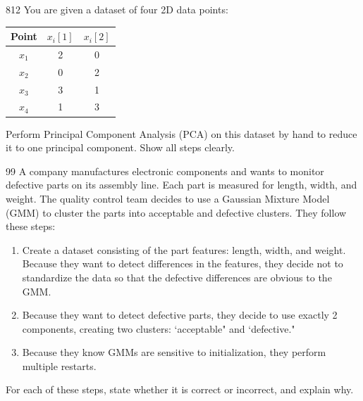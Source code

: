 \documentclass[11pt]{article}
\begin{document}
\begin{studentanswer}[20]
\end{studentanswer}


\begin{problem}{8}{12}
You are given a dataset of four 2D data points:

\begin{center}
\begin{tabular}{c|cc}
\textbf{Point} & $x_i\left[1\right]$ & $x_i\left[2\right]$ \\ \hline
$x_1$ & 2 & 0 \\
$x_2$ & 0 & 2 \\
$x_3$ & 3 & 1 \\
$x_4$ & 1 & 3 \\
\end{tabular}
\end{center}

Perform Principal Component Analysis (PCA) on this dataset by hand to reduce it to one principal component. Show all steps clearly.
\end{problem}

\begin{studentanswer}[20]
\end{studentanswer}



\begin{problem}{9}{9}
A company manufactures electronic components and wants to monitor defective parts on its assembly line. Each part is measured for length, width, and weight. The quality control team decides to use a Gaussian Mixture Model (GMM) to cluster the parts into acceptable and defective clusters. They follow these steps:
\begin{enumerate}[label=(\alph*)]
\item Create a dataset consisting of the part features: length, width, and weight. Because they want to detect differences in the features, they decide not to standardize the data so that the defective differences are obvious to the GMM.
\item Because they want to detect defective parts, they decide to use exactly 2 components, creating two clusters: `acceptable" and `defective."
\item Because they know GMMs are sensitive to initialization, they perform multiple restarts.

\end{enumerate}
For each of these steps, state whether it is correct or incorrect, and explain why.
\end{problem}
\end{document}
